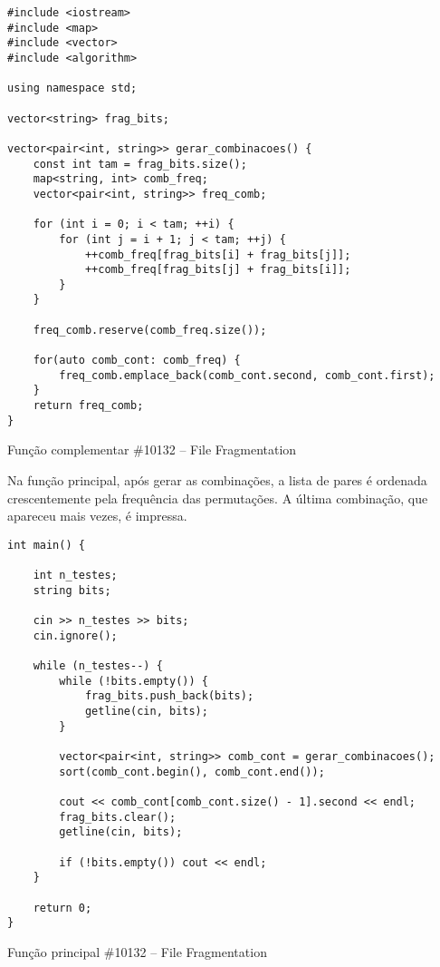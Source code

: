 \documentclass[a4paper,12pt]{scrartcl}
\begin{document}
\begin{listing}[H]
\begin{verbatim}
#include <iostream>
#include <map>
#include <vector>
#include <algorithm>

using namespace std;

vector<string> frag_bits;

vector<pair<int, string>> gerar_combinacoes() {
    const int tam = frag_bits.size();
    map<string, int> comb_freq;
    vector<pair<int, string>> freq_comb;

    for (int i = 0; i < tam; ++i) {
        for (int j = i + 1; j < tam; ++j) {
            ++comb_freq[frag_bits[i] + frag_bits[j]];
            ++comb_freq[frag_bits[j] + frag_bits[i]];
        }
    }

    freq_comb.reserve(comb_freq.size());

    for(auto comb_cont: comb_freq) {
        freq_comb.emplace_back(comb_cont.second, comb_cont.first);
    }
    return freq_comb;
}
\end{verbatim}
\caption{\footnotesize{Função complementar \#10132 – File Fragmentation}}
\end{listing}

Na função principal, após gerar as combinações, a lista de pares é ordenada crescentemente pela frequência das permutações. A última combinação, que apareceu mais vezes, é impressa.

\begin{listing}[H]
\begin{verbatim}
int main() {

    int n_testes;
    string bits;

    cin >> n_testes >> bits;
    cin.ignore();

    while (n_testes--) {
        while (!bits.empty()) {
            frag_bits.push_back(bits);
            getline(cin, bits);
        }

        vector<pair<int, string>> comb_cont = gerar_combinacoes();
        sort(comb_cont.begin(), comb_cont.end());

        cout << comb_cont[comb_cont.size() - 1].second << endl;
        frag_bits.clear();
        getline(cin, bits);

        if (!bits.empty()) cout << endl;
    }

    return 0;
}

\end{verbatim}
\caption{\footnotesize{Função principal \#10132 – File Fragmentation}}
\end{listing}
\end{document}
